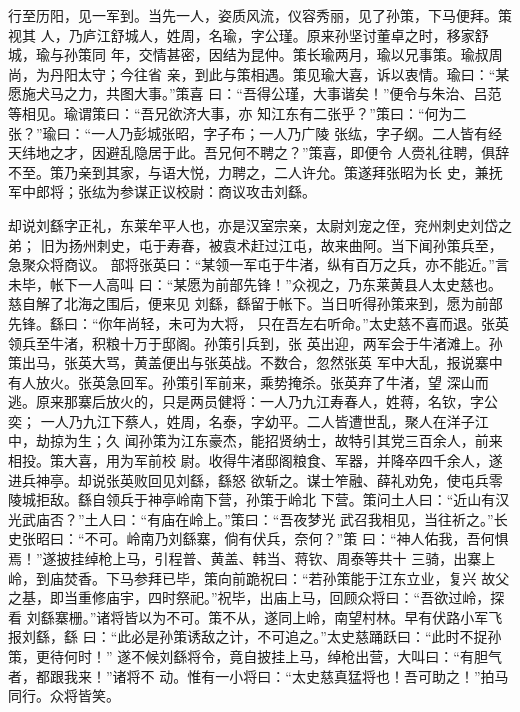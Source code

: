 行至历阳，见一军到。当先一人，姿质风流，仪容秀丽，见了孙策，下马便拜。策视其
人，乃庐江舒城人，姓周，名瑜，字公瑾。原来孙坚讨董卓之时，移家舒城，瑜与孙策同
年，交情甚密，因结为昆仲。策长瑜两月，瑜以兄事策。瑜叔周尚，为丹阳太守；今往省
亲，到此与策相遇。策见瑜大喜，诉以衷情。瑜曰：“某愿施犬马之力，共图大事。”策喜
曰：“吾得公瑾，大事谐矣！”便令与朱治、吕范等相见。瑜谓策曰：“吾兄欲济大事，亦
知江东有二张乎？”策曰：“何为二张？”瑜曰：“一人乃彭城张昭，字子布；一人乃广陵
张纮，字子纲。二人皆有经天纬地之才，因避乱隐居于此。吾兄何不聘之？”策喜，即便令
人赍礼往聘，俱辞不至。策乃亲到其家，与语大悦，力聘之，二人许允。策遂拜张昭为长
史，兼抚军中郎将；张纮为参谋正议校尉：商议攻击刘繇。

却说刘繇字正礼，东莱牟平人也，亦是汉室宗亲，太尉刘宠之侄，兖州刺史刘岱之弟；
旧为扬州刺史，屯于寿春，被袁术赶过江屯，故来曲阿。当下闻孙策兵至，急聚众将商议。
部将张英曰：“某领一军屯于牛渚，纵有百万之兵，亦不能近。”言未毕，帐下一人高叫
曰：“某愿为前部先锋！”众视之，乃东莱黄县人太史慈也。慈自解了北海之围后，便来见
刘繇，繇留于帐下。当日听得孙策来到，愿为前部先锋。繇曰：“你年尚轻，未可为大将，
只在吾左右听命。”太史慈不喜而退。张英领兵至牛渚，积粮十万于邸阁。孙策引兵到，张
英出迎，两军会于牛渚滩上。孙策出马，张英大骂，黄盖便出与张英战。不数合，忽然张英
军中大乱，报说寨中有人放火。张英急回军。孙策引军前来，乘势掩杀。张英弃了牛渚，望
深山而逃。原来那寨后放火的，只是两员健将：一人乃九江寿春人，姓蒋，名钦，字公奕；
一人乃九江下蔡人，姓周，名泰，字幼平。二人皆遭世乱，聚人在洋子江中，劫掠为生；久
闻孙策为江东豪杰，能招贤纳士，故特引其党三百余人，前来相投。策大喜，用为军前校
尉。收得牛渚邸阁粮食、军器，并降卒四千余人，遂进兵神亭。却说张英败回见刘繇，繇怒
欲斩之。谋士笮融、薛礼劝免，使屯兵零陵城拒敌。繇自领兵于神亭岭南下营，孙策于岭北
下营。策问土人曰：“近山有汉光武庙否？”土人曰：“有庙在岭上。”策曰：“吾夜梦光
武召我相见，当往祈之。”长史张昭曰：“不可。岭南乃刘繇寨，倘有伏兵，奈何？”策
曰：“神人佑我，吾何惧焉！”遂披挂绰枪上马，引程普、黄盖、韩当、蒋钦、周泰等共十
三骑，出寨上岭，到庙焚香。下马参拜已毕，策向前跪祝曰：“若孙策能于江东立业，复兴
故父之基，即当重修庙宇，四时祭祀。”祝毕，出庙上马，回顾众将曰：“吾欲过岭，探看
刘繇寨栅。”诸将皆以为不可。策不从，遂同上岭，南望村林。早有伏路小军飞报刘繇，繇
曰：“此必是孙策诱敌之计，不可追之。”太史慈踊跃曰：“此时不捉孙策，更待何时！”
遂不候刘繇将令，竟自披挂上马，绰枪出营，大叫曰：“有胆气者，都跟我来！”诸将不
动。惟有一小将曰：“太史慈真猛将也！吾可助之！”拍马同行。众将皆笑。


